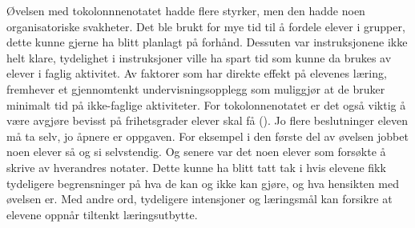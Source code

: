 \documentclass[main.tex]{subfiles}
\begin{document}
\newline
\newline
Øvelsen med tokolonnnenotatet hadde flere styrker, men den hadde noen organisatoriske svakheter. 
Det ble brukt for mye tid til å fordele elever i grupper, dette kunne gjerne ha blitt planlagt på 
forhånd. Dessuten var instruksjonene ikke helt klare, tydelighet i instruksjoner ville ha spart tid 
som kunne da brukes av elever i faglig aktivitet. Av faktorer som har direkte effekt på elevenes 
læring, fremhever  et gjennomtenkt undervisningsopplegg som muliggjør at 
de bruker minimalt tid på ikke-faglige aktiviteter. For tokolonnenotatet er det også viktig å være 
avgjøre bevisst på frihetsgrader elever skal få (). Jo flere beslutninger eleven 
må ta selv, jo åpnere er oppgaven. For eksempel i den første del av øvelsen jobbet noen elever 
så og si selvstendig. Og senere var det noen elever som forsøkte å skrive av hverandres notater.
Dette kunne ha blitt tatt tak i hvis elevene fikk tydeligere begrensninger på hva de kan og ikke
kan gjøre, og hva hensikten med øvelsen er. Med andre ord, tydeligere intensjoner og læringsmål
kan forsikre at elevene oppnår tiltenkt læringsutbytte. 
\end{document}
